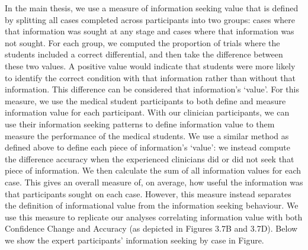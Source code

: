 \documentclass[a4paper, nobind]{templates/ociamthesis}
\begin{document}
In the main thesis, we use a measure of information seeking value that is defined by splitting all cases completed across participants into two groups: cases where that information was sought at any stage and cases where that information was not sought. For each group, we computed the proportion of trials where the students included a correct differential, and then take the difference between these two values. A positive value would indicate that students were more likely to identify the correct condition with that information rather than without that information. This difference can be considered that information's `value'. For this measure, we use the medical student participants to both define and measure information value for each participant. With our clinician participants, we can use their information seeking patterns to define information value to them measure the performance of the medical students. We use a similar method as defined above to define each piece of information's `value': we instead compute the difference accuracy when the experienced clinicians did or did not seek that piece of information. We then calculate the sum of all information values for each case. This gives an overall measure of, on average, how useful the information was that participants sought on each case. However, this measure instead separates the definition of informational value from the information seeking behaviour. We use this measure to replicate our analyses correlating information value with both Confidence Change and Accuracy (as depicted in Figures 3.7B and 3.7D). Below we show the expert participants' information seeking by case in Figure.
\end{document}

